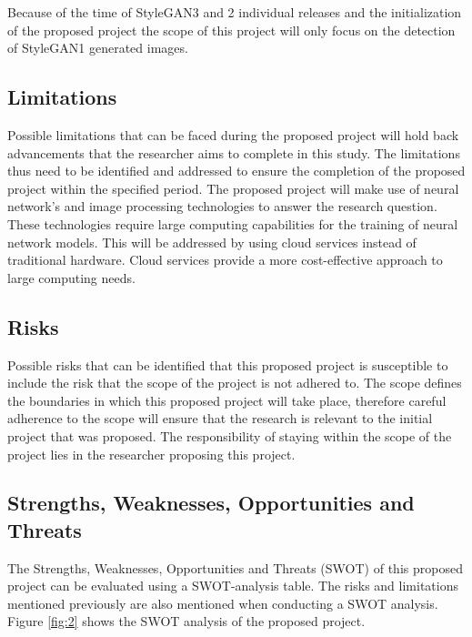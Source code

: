Because of the time of StyleGAN3 and 2 individual releases and the initialization of the proposed project the scope of this project will only focus on the detection of StyleGAN1 generated images. 


\subsection{Limitations}

Possible limitations that can be faced during the proposed project will hold back advancements that the researcher aims to complete in this study. The limitations thus need to be identified and addressed to ensure the completion of the proposed project within the specified period. The proposed project will make use of neural network's and image processing technologies to answer the research question. These technologies require large computing capabilities for the training of neural network models. This will be addressed by using cloud services instead of traditional hardware. Cloud services provide a more cost-effective approach to large computing needs.

\subsection{Risks}

Possible risks that can be identified that this proposed project is susceptible to include the risk that the scope of the project is not adhered to. The scope defines the boundaries in which this proposed project will take place, therefore careful adherence to the scope will ensure that the research is relevant to the initial project that was proposed. The responsibility of staying within the scope of the project lies in the researcher proposing this project.

\subsection{Strengths, Weaknesses, Opportunities and Threats}

The Strengths, Weaknesses, Opportunities and Threats (SWOT) of this proposed project can be evaluated using a SWOT-analysis table. The risks and limitations mentioned previously are also mentioned when conducting a SWOT analysis. Figure \ref{fig:2} shows the SWOT analysis of the proposed project.

